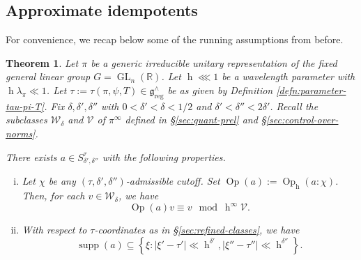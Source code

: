 \documentclass[reqno]{amsart}
\DeclareMathOperator{\GL}{GL}
\DeclareMathOperator{\h}{h}
\DeclareMathOperator{\Opp}{Op}
\DeclareMathOperator{\reg}{reg}
\DeclareMathOperator{\supp}{supp}
\theoremstyle{plain} \newtheorem{theorem} {Theorem}
\theoremstyle{definition} \newtheorem{definition} [theorem] {Definition}
\theoremstyle{itplain} %
\numberwithin{equation}{section}
\numberwithin{theorem}{section}
\begin{document}
\subsection{Approximate idempotents}\label{sec:appr-idemp}
For convenience, we recap below some of the running assumptions from before.
\begin{theorem}\label{thm:appr-idemp}
  Let $\pi$ be a generic irreducible unitary representation of the fixed general linear group $G = \GL_n(\mathbb{R})$.  Let $\h \lll 1$ be a wavelength parameter with $\h \lambda_\pi \ll 1$.  Let $\tau := \tau(\pi,\psi,T) \in \mathfrak{g}^\wedge_{\reg}$ be as given by Definition \ref{defn:parameter-tau-pi-T}.  Fix $\delta, \delta ', \delta ''$ with $0 < \delta ' < \delta < 1/2$ and $\delta ' < \delta '' < 2 \delta '$.  Recall the subclasses $\mathcal{W}_\delta$ and $\mathcal{V}$ of $\pi^\infty$ defined in \S\ref{sec:quant-prel} and \S\ref{sec:control-over-norms}.
  
  There exists $a \in S^\tau_{\delta ', \delta ''}$ with the following properties.
  \begin{enumerate}[(i)]
  \item Let $\chi$ be any $(\tau,\delta ',\delta '')$-admissible cutoff.  Set $\Opp(a) := \Opp_{\h}(a:\chi)$.  Then, for each $v \in \mathcal{W}_\delta$, we have
    \begin{equation}\label{eq:oppa-v-equiv}
    \Opp(a) v \equiv v \mod{\h^\infty \mathcal{V}}.
  \end{equation}
  \item With respect to $\tau$-coordinates as in \S\ref{sec:refined-classes}, we have
    \begin{equation}\label{eqn:a-desired-support-condition}
      \supp(a)
      \subseteq 
      \left\{ \xi :
        |\xi ' - \tau '| \ll \h^{\delta '},
        |\xi '' - \tau ''| \ll \h^{\delta ''}
      \right\}.
    \end{equation}
  \end{enumerate}
\end{theorem}
\end{document}
